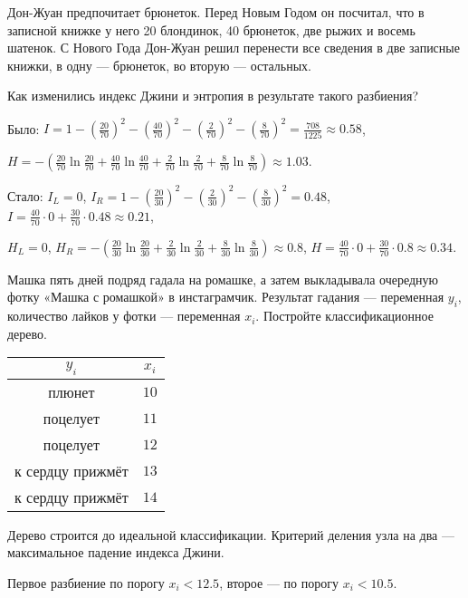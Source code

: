 \begin{problem}
Дон-Жуан предпочитает брюнеток. Перед Новым Годом он посчитал, что в записной книжке у него 20 блондинок, 40 брюнеток, две рыжих и восемь шатенок. С Нового Года Дон-Жуан решил перенести все сведения в две записные книжки, в одну — брюнеток, во вторую — остальных.

Как изменились индекс Джини и энтропия в результате такого разбиения?
\begin{sol}
Было: $I = 1 - \left(\frac{20}{70}\right)^2 - \left(\frac{40}{70}\right)^2- \left(\frac{2}{70}\right)^2- \left(\frac{8}{70}\right)^2 = \frac{708}{1225} \approx 0.58$,

$H =-\left( \frac{20}{70} \ln \frac{20}{70} +  \frac{40}{70} \ln \frac{40}{70} +  \frac{2}{70} \ln \frac{2}{70} +  \frac{8}{70} \ln \frac{8}{70}  \right) \approx 1.03$.

Стало: $I_L = 0$, $I_R = 1 - \left(\frac{20}{30}\right)^2 - \left(\frac{2}{30}\right)^2 - \left(\frac{8}{30}\right)^2 = 0.48$, $I = \frac{40}{70}\cdot 0 + \frac{30}{70} \cdot 0.48 \approx 0.21$,

$H_L = 0$, $H_R = -\left(\frac{20}{30} \ln \frac{20}{30} + \frac{2}{30} \ln \frac{2}{30} + \frac{8}{30} \ln \frac{8}{30} \right) \approx 0.8$, $H =  \frac{40}{70}\cdot 0 + \frac{30}{70} \cdot 0.8 \approx 0.34$.

\end{sol}
\end{problem}



\begin{problem}
Машка пять дней подряд гадала на ромашке, а затем выкладывала очередную фотку «Машка с ромашкой» в инстаграмчик. Результат гадания — переменная $y_i$, количество лайков у фотки — переменная $x_i$. Постройте классификационное дерево.

\begin{tabular}{cc}
$y_i$ & $x_i$ \\
\hline
плюнет & $10$ \\
поцелует & $11$ \\
поцелует & $12$ \\
к сердцу прижмёт & $13$ \\
к сердцу прижмёт & $14$ \\
\end{tabular}

Дерево строится до идеальной классификации. Критерий деления узла на два — максимальное падение индекса Джини.


\begin{sol}
Первое разбиение по порогу $x_i < 12.5$, второе — по порогу $x_i < 10.5$.
\end{sol}
\end{problem}




